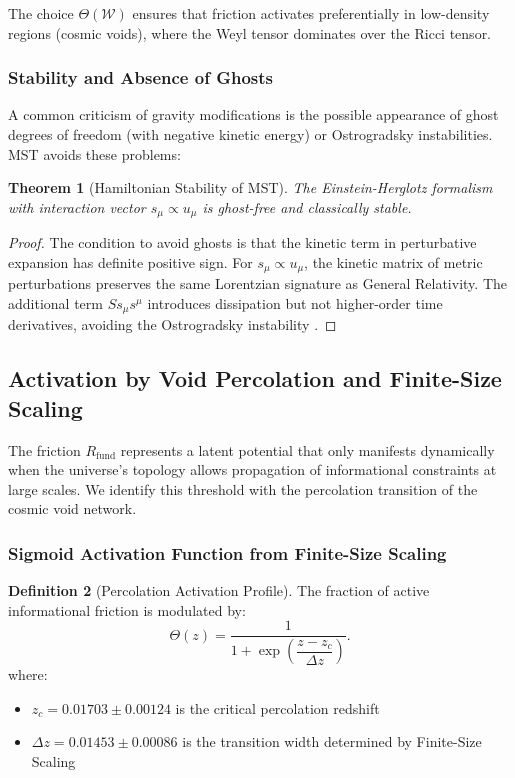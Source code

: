 \documentclass[11pt, a4paper]{article}
\theoremstyle{plain}
\newtheorem{theorem}{Theorem}[section]
\theoremstyle{definition}
\newtheorem{definition}[theorem]{Definition}
\newcommand{\Rfactor}{R_{\text{fund}}}
\begin{document}
The choice $\Theta(\mathcal{W})$ ensures that friction activates preferentially in low-density regions (cosmic voids), where the Weyl tensor dominates over the Ricci tensor.

\subsubsection{Stability and Absence of Ghosts}

A common criticism of gravity modifications is the possible appearance of ghost degrees of freedom (with negative kinetic energy) or Ostrogradsky instabilities. MST avoids these problems:

\begin{theorem}[Hamiltonian Stability of MST]
The Einstein-Herglotz formalism with interaction vector $s_\mu \propto u_\mu$ is ghost-free and classically stable.
\end{theorem}

\begin{proof}
The condition to avoid ghosts is that the kinetic term in perturbative expansion has definite positive sign. For $s_\mu \propto u_\mu$, the kinetic matrix of metric perturbations preserves the same Lorentzian signature as General Relativity. The additional term $S s_\mu s^\mu$ introduces dissipation but not higher-order time derivatives, avoiding the Ostrogradsky instability \cite{Lazo2017}.
\end{proof}

\subsection{Activation by Void Percolation and Finite-Size Scaling}

The friction $\Rfactor$ represents a latent potential that only manifests dynamically when the universe's topology allows propagation of informational constraints at large scales. We identify this threshold with the percolation transition of the cosmic void network.

\subsubsection{Sigmoid Activation Function from Finite-Size Scaling}

\begin{definition}[Percolation Activation Profile]
The fraction of active informational friction is modulated by:
\begin{equation}
\Theta(z) = \frac{1}{1 + \exp\left(\dfrac{z - z_c}{\Delta z}\right)}.
\label{eq:activation_function}
\end{equation}
where:
\begin{itemize}
    \item $z_c = 0.01703 \pm 0.00124$ is the critical percolation redshift
    \item $\Delta z = 0.01453 \pm 0.00086$ is the transition width determined by Finite-Size Scaling
\end{itemize}
\end{definition}
\end{document}
